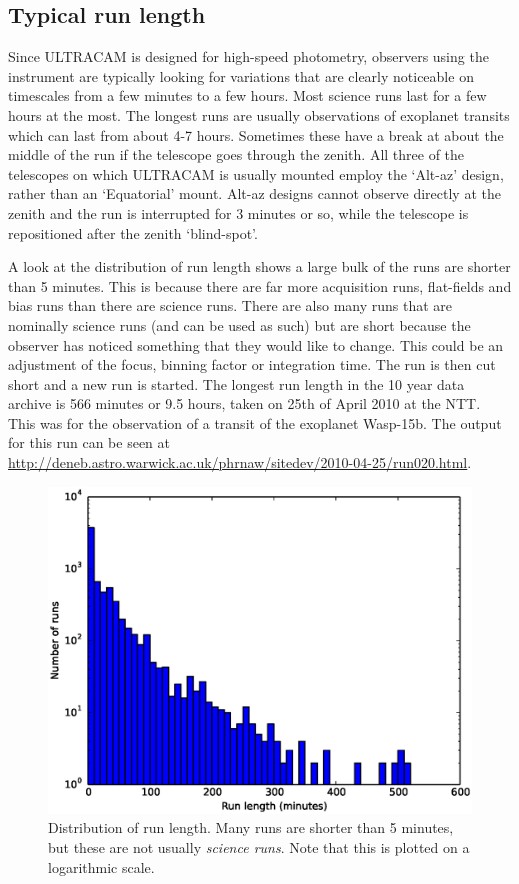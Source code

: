 \subsection{Typical run length}
Since ULTRACAM is designed for high-speed photometry, observers using the instrument are typically looking for variations that are clearly noticeable on timescales from a few minutes to a few hours. Most science runs last for a few hours at the most. The longest runs are usually observations of exoplanet transits which can last from about 4-7 hours. Sometimes these have a break at about the middle of the run if the telescope goes through the zenith. All three of the telescopes on which ULTRACAM is usually mounted employ the `Alt-az' design, rather than an `Equatorial' mount. Alt-az designs cannot observe directly at the zenith and the run is interrupted for 3 minutes or so, while the telescope is repositioned after the zenith `blind-spot'.

A look at the distribution of run length shows a large bulk of the runs are shorter than 5 minutes. This is because there are far more acquisition runs, flat-fields and bias runs than there are science runs. There are also many runs that are nominally science runs (and can be used as such) but are short because the observer has noticed something that they would like to change. This could be an adjustment of the focus, binning factor or integration time. The run is then cut short and a new run is started. The longest run length in the 10 year data archive is 566 minutes or 9.5 hours, taken on 25th of April 2010 at the NTT. This was for the observation of a transit of the exoplanet Wasp-15b. The output for this run can be seen at \url{http://deneb.astro.warwick.ac.uk/phrnaw/sitedev/2010-04-25/run020.html}. 

\begin{figure}
  \centering
  \includegraphics[width=120mm]{images/hist0-600_log.eps}
  \caption{Distribution of run length. Many runs are shorter than 5 minutes, but these are not usually \emph{science runs}. Note that this is plotted on a logarithmic scale. }
  \label{fig:histogram0-600}
\end{figure}

